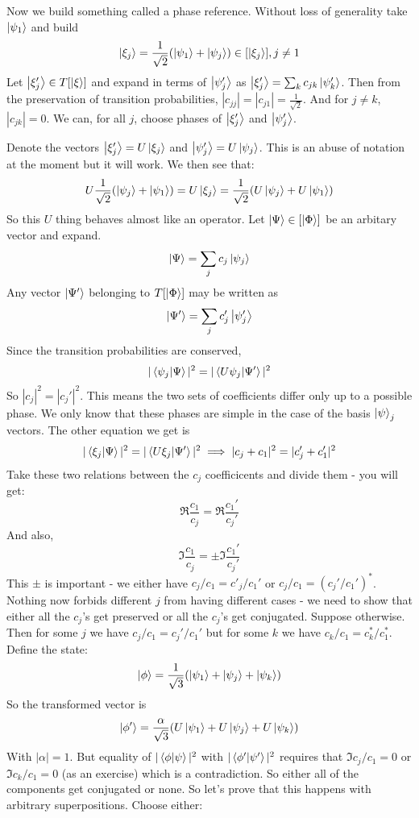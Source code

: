 \documentclass{article}
\begin{document}
Now we build something called a phase reference. Without loss of generality take $\ket{\psi_1}$ and build 
\[\ket{\xi_j} = \frac{1}{\sqrt{2}}(\ket{\psi_1} + \ket{\psi_j}) \in [\ket{\xi_j}], j \neq 1\]
Let $\ket{\xi_j'} \in T[\ket\xi]$ and expand in terms of $\ket{\psi_j'}$ as $\ket{\xi_j'} = \sum_k c_{jk}\ket{\psi'_k}$. Then from the preservation of transition probabilities, $|c_{jj}|=|c_{j1}| = \frac{1}{\sqrt{2}}$. And for $j\neq k$, $|c_{jk}|=0$. We can, for all $j$, choose phases of $\ket{\xi_j'}$ and $\ket{\psi_j'}$.

Denote the vectors $\ket{\xi_j'} = U\ket{\xi_j}$ and $\ket{\psi_j'} = U\ket{\psi_j}$. This is an abuse of notation at the moment but it will work. We then see that:
\[U\frac{1}{\sqrt{2}}(\ket{\psi_j}+\ket{\psi_1}) = U\ket{\xi_j} = \frac{1}{\sqrt{2}}(U\ket{\psi_j}+U\ket{\psi_1})\]
So this $U$ thing behaves almost like an operator. Let $\ket{\Psi} \in [\ket\Phi]$ be an arbitary vector and expand.
\[\ket\Psi = \sum_j c_j \ket{\psi_j}\]
Any vector $\ket{\Psi'}$ belonging to $T[\ket\Phi]$ may be written as
\[\ket{\Psi'} = \sum_j c_j' \ket{\psi_j'}\]
Since the transition probabilities are conserved,
\[|\braket{\psi_j}{\Psi}|^2 = |\braket{U\psi_j}{\Psi'}|^2\]
So $|c_j|^2 = |c_j'|^2$. This means the two sets of coefficients differ only up to a possible phase. We only know that these phases are simple in the case of the basis $\ket\psi_j$ vectors. The other equation we get is
\[|\braket{\xi_j}{\Psi}|^2 = |\braket{U\xi_j}{\Psi'}|^2 \implies |c_j+c_1|^2 = |c_j'+c_1'|^2\]
Take these two relations between the $c_j$ coefficicents and divide them - you will get:
\[\Re\frac{c_1}{c_j} = \Re \frac{c_1'}{c_j'}\]
And also,
\[\Im\frac{c_1}{c_j} = \pm \Im \frac{c_1'}{c_j'}\]
This $\pm$ is important - we either have $c_j/c_1 = c'_j/c_1'$ or $c_j/c_1 = (c_j'/c_1')^*$. Nothing now forbids different $j$ from having different cases - we need to show that either all the $c_j$'s get preserved or all the $c_j$'s get conjugated. Suppose otherwise. Then for some $j$ we have $c_j/c_1 = c_j'/c_1'$ but for some $k$ we have $c_k/c_1 = c_k^*/c_1^*$. Define the state:
\[\ket\phi = \frac{1}{\sqrt 3} (\ket{\psi_1} + \ket{\psi_j} + \ket{\psi_k})\]
So the transformed vector is 
\[\ket{\phi'} = \frac{\alpha}{\sqrt 3} (U\ket{\psi_1} + U\ket{\psi_j} + U\ket{\psi_k})\]
With $|\alpha| = 1$. But equality of $|\braket{\phi}{\psi}|^2$ with $|\braket{\phi'}{\psi'}|^2$ requires that $\Im c_j/c_1 = 0 $ or $\Im c_k/c_1 = 0$ (as an exercise) which is a contradiction. So either all of the components get conjugated or none. So let's prove that this happens with arbitrary superpositions. Choose either:
\end{document}
